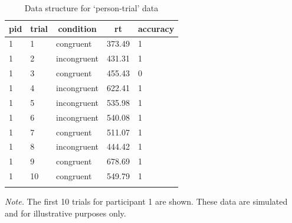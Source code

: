 \documentclass[
  man,floatsintext]{apa6}
\begin{document}
\begin{table}[H]

\begin{center}
\begin{threeparttable}

\caption{\label{tab:ca-data-table}Data structure for `person-trial' data}

\begin{tabular}{lllll}
\toprule
pid & \multicolumn{1}{c}{trial} & \multicolumn{1}{c}{condition} & \multicolumn{1}{c}{rt} & \multicolumn{1}{c}{accuracy}\\
\midrule
1 & 1 & congruent & 373.49 & 1\\
1 & 2 & incongruent & 431.31 & 1\\
1 & 3 & congruent & 455.43 & 0\\
1 & 4 & incongruent & 622.41 & 1\\
1 & 5 & incongruent & 535.98 & 1\\
1 & 6 & incongruent & 540.08 & 1\\
1 & 7 & congruent & 511.07 & 1\\
1 & 8 & incongruent & 444.42 & 1\\
1 & 9 & congruent & 678.69 & 1\\
1 & 10 & congruent & 549.79 & 1\\
\bottomrule
\addlinespace
\end{tabular}

\begin{tablenotes}[para]
\normalsize{\textit{Note.} The first 10 trials for participant 1 are shown. These data are simulated and for illustrative purposes only.}
\end{tablenotes}

\end{threeparttable}
\end{center}

\end{table}
\end{document}
